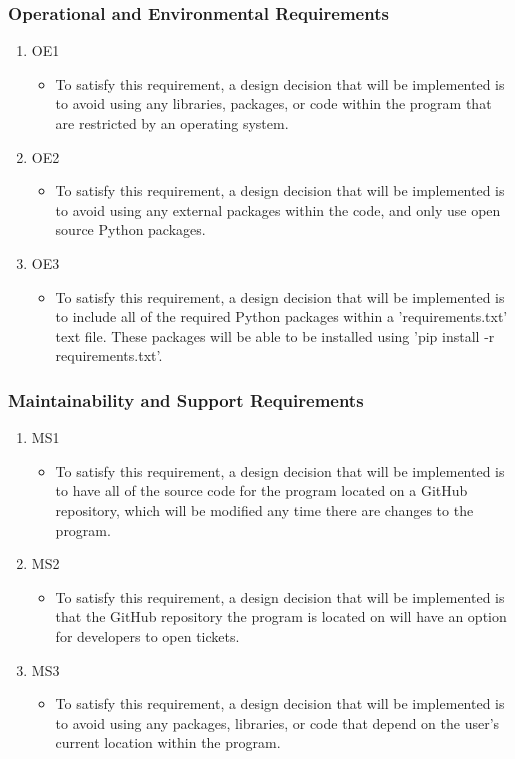 \documentclass[12pt, titlepage]{article}
\begin{document}
\subsubsection{Operational and Environmental Requirements}

\begin{enumerate}
    \item OE1
    \begin{itemize}
        \item To satisfy this requirement, a design decision that will be implemented is to avoid using any libraries, packages, or code within the program that are restricted by an operating system.
    \end{itemize}
    \item OE2
    \begin{itemize}
        \item To satisfy this requirement, a design decision that will be implemented is to avoid using any external packages within the code, and only use open source Python packages.
    \end{itemize}
    \item OE3
    \begin{itemize}
        \item To satisfy this requirement, a design decision that will be implemented is to include all of the required Python packages within a 'requirements.txt' text file. These packages will be able to be installed using 'pip install -r requirements.txt'.
    \end{itemize}
\end{enumerate}

\subsubsection{Maintainability and Support Requirements}

\begin{enumerate}
    \item MS1
    \begin{itemize}
        \item To satisfy this requirement, a design decision that will be implemented is to have all of the source code for the program located on a GitHub repository, which will be modified any time there are changes to the program.
    \end{itemize}
    \item MS2
    \begin{itemize}
        \item To satisfy this requirement, a design decision that will be implemented is that the GitHub repository the program is located on will have an option for developers to open tickets.
    \end{itemize}
    \item MS3
    \begin{itemize}
        \item To satisfy this requirement, a design decision that will be implemented is to avoid using any packages, libraries, or code that depend on the user's current location within the program.
    \end{itemize}
\end{enumerate}
\end{document}
